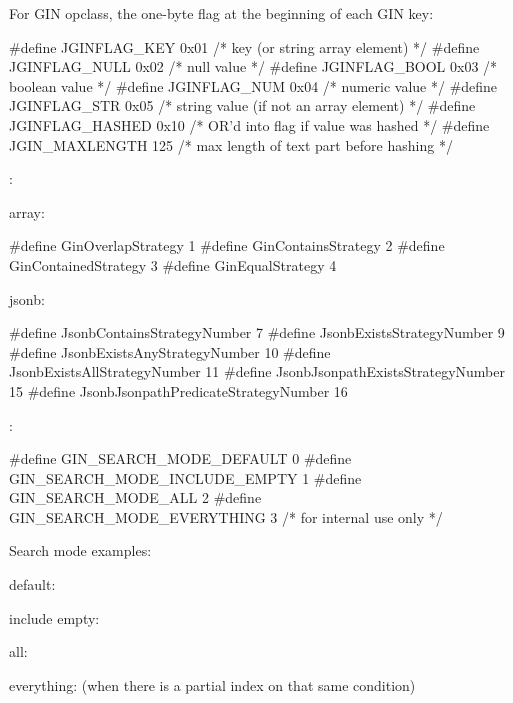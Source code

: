 For  GIN opclass, the one-byte flag at the beginning of
each GIN key:

\begin{ccode}
#define JGINFLAG_KEY    0x01    /* key (or string array element) */
#define JGINFLAG_NULL   0x02    /* null value */
#define JGINFLAG_BOOL   0x03    /* boolean value */
#define JGINFLAG_NUM    0x04    /* numeric value */
#define JGINFLAG_STR    0x05    /* string value (if not an array element) */
#define JGINFLAG_HASHED 0x10    /* OR'd into flag if value was hashed */
#define JGIN_MAXLENGTH  125     /* max length of text part before hashing */
\end{ccode}

:

\begin{oparts}
\item array:
  \begin{ccode}
#define GinOverlapStrategy      1
#define GinContainsStrategy     2
#define GinContainedStrategy    3
#define GinEqualStrategy        4
  \end{ccode}
\item jsonb:
  \begin{ccode}
#define JsonbContainsStrategyNumber   7
#define JsonbExistsStrategyNumber   9
#define JsonbExistsAnyStrategyNumber  10
#define JsonbExistsAllStrategyNumber  11
#define JsonbJsonpathExistsStrategyNumber   15
#define JsonbJsonpathPredicateStrategyNumber  16
  \end{ccode}
\end{oparts}

:

\begin{ccode}
#define GIN_SEARCH_MODE_DEFAULT         0
#define GIN_SEARCH_MODE_INCLUDE_EMPTY   1
#define GIN_SEARCH_MODE_ALL             2
#define GIN_SEARCH_MODE_EVERYTHING      3   /* for internal use only */
\end{ccode}

Search mode examples:

\begin{oparts}
\item default:
\item include empty:
\item all:
\item everything:
   (when there is a partial index on that same condition)
\end{oparts}

